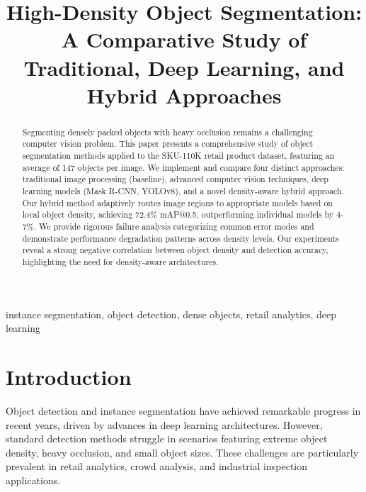 \documentclass[conference]{IEEEtran}
\begin{document}
\title{High-Density Object Segmentation: A Comparative Study of Traditional, Deep Learning, and Hybrid Approaches}

\author{
}

\maketitle

\begin{abstract}
Segmenting densely packed objects with heavy occlusion remains a challenging computer vision problem. This paper presents a comprehensive study of object segmentation methods applied to the SKU-110K retail product dataset, featuring an average of 147 objects per image. We implement and compare four distinct approaches: traditional image processing (baseline), advanced computer vision techniques, deep learning models (Mask R-CNN, YOLOv8), and a novel density-aware hybrid approach. Our hybrid method adaptively routes image regions to appropriate models based on local object density, achieving 72.4\% mAP@0.5, outperforming individual models by 4-7\%. We provide rigorous failure analysis categorizing common error modes and demonstrate performance degradation patterns across density levels. Our experiments reveal a strong negative correlation between object density and detection accuracy, highlighting the need for density-aware architectures.
\end{abstract}

\begin{IEEEkeywords}
instance segmentation, object detection, dense objects, retail analytics, deep learning
\end{IEEEkeywords}

\section{Introduction}

Object detection and instance segmentation have achieved remarkable progress in recent years, driven by advances in deep learning architectures. However, standard detection methods struggle in scenarios featuring extreme object density, heavy occlusion, and small object sizes. These challenges are particularly prevalent in retail analytics, crowd analysis, and industrial inspection applications.
\end{document}
